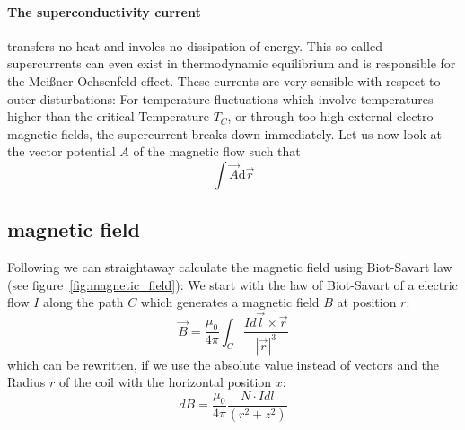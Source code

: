 \paragraph{The superconductivity current} transfers no heat and involes
 no dissipation of energy. This 
so called supercurrents can even exist in thermodynamic equilibrium and
is responsible for the Meißner-Ochsenfeld effect. These currents are very
sensible with respect to outer disturbations: For temperature fluctuations
which involve temperatures higher than the critical Temperature $T_C$, 
or through too high external electro-magnetic fields, the supercurrent
breaks down immediately. Let us now look at the vector potential $A$ of the 
magnetic flow such that
\begin{equation}
\int \vec{A} \mathrm{d} \vec{r}
\end{equation} 
\subsection{magnetic field}
Following we can straightaway calculate the magnetic field using
Biot-Savart law (see figure~\ref{fig:magnetic_field}):
We start with the law of Biot-Savart of a electric flow $I$ along the path $C$ which generates
a magnetic field $B$ at position $r$:
\begin{equation}
    \vec{B} = \frac{\mu_0}{4\pi} \int_{C} \frac{I d\vec{l} \times \vec{r}}{|\vec{r}|^3} 
\end{equation}
which can be rewritten, if we use the absolute value instead of vectors and the Radius $r$ of the
coil with the horizontal position $x$:
\begin{equation}
    dB = \frac{\mu_0}{4\pi} \frac{N \cdot I dl}{(r^2 + z^2)} 
\end{equation}

